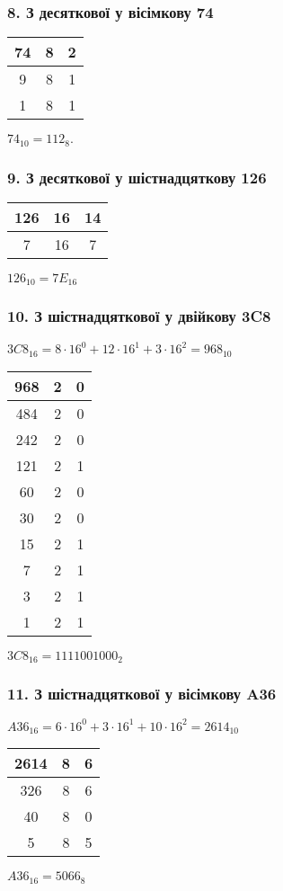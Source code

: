 \documentclass[14pt]{extreport}
\begin{document}
\subsubsection{8. З десяткової у вісімкову 74 }
\begin{tabular}{c|c|c}
	74&8&2\\
	\hline
	9&8&1\\
	\hline
	1&8&1\\
\end{tabular}
\hspace{.1\textwidth}
$74_{10}=112_8.$
\subsubsection{9. З десяткової у шістнадцяткову 126 }
\begin{tabular}{c|c|c}
	126 & 16 & 14\\
	\hline
	7 & 16 & 7 \\
\end{tabular}
\hspace{.1\textwidth}
$126_{10}=7E_{16}$
\subsubsection{10. З шістнадцяткової у двійкову 3C8 }
$3C8_{16}=8\cdot16^0+12\cdot16^1+3\cdot16^2=968_{10}$

\bigskip
\begin{tabular}{c|c|c}
	968 & 2 & 0 \\
	\hline
	484 & 2 & 0 \\
	\hline
	242 & 2 & 0 \\
	\hline
	121 & 2 & 1 \\
	\hline
	60 & 2 & 0 \\
	\hline
	30 & 2 & 0 \\
	\hline
	15 & 2 & 1 \\
	\hline
	7 & 2 & 1 \\
	\hline
	3 & 2 & 1 \\
	\hline
	1 & 2 & 1 \\
\end{tabular}
\hspace{.1\textwidth}
$3C8_{16}=1111001000_2$

\subsubsection{11. З шістнадцяткової у вісімкову A36 }
$A36_{16}=6\cdot16^0+3\cdot16^1+10\cdot16^2=2614_{10}$

\bigskip
\begin{tabular}{c|c|c}
	2614 & 8 & 6 \\
	\hline
	326 & 8 & 6 \\
	\hline
	40 & 8 & 0 \\
	\hline
	5 & 8 & 5 \\
\end{tabular}
\hspace{.1\textwidth}
$A36_{16}=5066_8$
\end{document}
